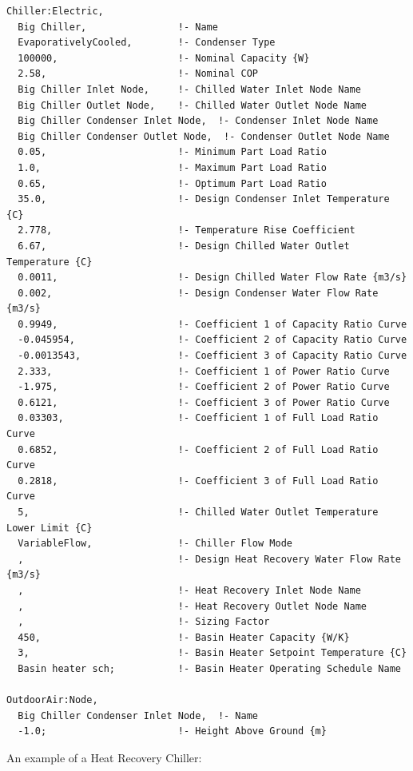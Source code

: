 \begin{lstlisting}
Chiller:Electric,
  Big Chiller,                !- Name
  EvaporativelyCooled,        !- Condenser Type
  100000,                     !- Nominal Capacity {W}
  2.58,                       !- Nominal COP
  Big Chiller Inlet Node,     !- Chilled Water Inlet Node Name
  Big Chiller Outlet Node,    !- Chilled Water Outlet Node Name
  Big Chiller Condenser Inlet Node,  !- Condenser Inlet Node Name
  Big Chiller Condenser Outlet Node,  !- Condenser Outlet Node Name
  0.05,                       !- Minimum Part Load Ratio
  1.0,                        !- Maximum Part Load Ratio
  0.65,                       !- Optimum Part Load Ratio
  35.0,                       !- Design Condenser Inlet Temperature {C}
  2.778,                      !- Temperature Rise Coefficient
  6.67,                       !- Design Chilled Water Outlet Temperature {C}
  0.0011,                     !- Design Chilled Water Flow Rate {m3/s}
  0.002,                      !- Design Condenser Water Flow Rate {m3/s}
  0.9949,                     !- Coefficient 1 of Capacity Ratio Curve
  -0.045954,                  !- Coefficient 2 of Capacity Ratio Curve
  -0.0013543,                 !- Coefficient 3 of Capacity Ratio Curve
  2.333,                      !- Coefficient 1 of Power Ratio Curve
  -1.975,                     !- Coefficient 2 of Power Ratio Curve
  0.6121,                     !- Coefficient 3 of Power Ratio Curve
  0.03303,                    !- Coefficient 1 of Full Load Ratio Curve
  0.6852,                     !- Coefficient 2 of Full Load Ratio Curve
  0.2818,                     !- Coefficient 3 of Full Load Ratio Curve
  5,                          !- Chilled Water Outlet Temperature Lower Limit {C}
  VariableFlow,               !- Chiller Flow Mode
  ,                           !- Design Heat Recovery Water Flow Rate {m3/s}
  ,                           !- Heat Recovery Inlet Node Name
  ,                           !- Heat Recovery Outlet Node Name
  ,                           !- Sizing Factor
  450,                        !- Basin Heater Capacity {W/K}
  3,                          !- Basin Heater Setpoint Temperature {C}
  Basin heater sch;           !- Basin Heater Operating Schedule Name

OutdoorAir:Node,
  Big Chiller Condenser Inlet Node,  !- Name
  -1.0;                       !- Height Above Ground {m}
\end{lstlisting}

An example of a Heat Recovery Chiller:

